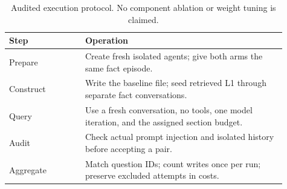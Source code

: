 \begin{table}[htbp]
\centering\small
\caption{Audited execution protocol. No component ablation or weight tuning is claimed.}
\label{tab:protocol}
\begin{tabular}{p{0.25\linewidth}p{0.66\linewidth}}\toprule
Step & Operation \\\midrule
Prepare & Create fresh isolated agents; give both arms the same fact episode. \\
Construct & Write the baseline file; seed retrieved L1 through separate fact conversations. \\
Query & Use a fresh conversation, no tools, one model iteration, and the assigned section budget. \\
Audit & Check actual prompt injection and isolated history before accepting a pair. \\
Aggregate & Match question IDs; count writes once per run; preserve excluded attempts in costs. \\
\bottomrule\end{tabular}\end{table}

\FloatBarrier
